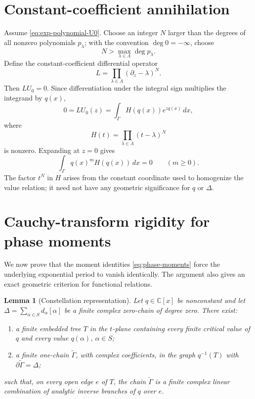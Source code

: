 \documentclass[11pt]{article}
\numberwithin{equation}{section}
\newtheorem{lemma}[lemma]{Lemma}
\theoremstyle{definition}
\theoremstyle{remark}
\newcommand{\C}{\mathbb C}
\begin{document}
\section{Constant-coefficient annihilation}\label{sec:annihilation}

Assume \eqref{eq:exp-polynomial-U0}.  Choose an integer $N$ larger than the
degrees of all nonzero polynomials $p_\lambda$; with the convention
$\deg0=-\infty$, choose
\[
  N>\max_{\lambda\in\Lambda}\deg p_\lambda.
\]
Define the constant-coefficient differential operator
\begin{equation}\label{eq:L-operator}
  L=\prod_{\lambda\in\Lambda}(\partial_z-\lambda)^N.
\end{equation}
Then $LU_0=0$.  Since differentiation under the integral sign multiplies the
integrand by $q(x)$,
\begin{equation}\label{eq:annihilated-integral}
  0=LU_0(z)
  =\int_\Gamma H(q(x))e^{zq(x)}\,dx,
\end{equation}
where
\begin{equation}\label{eq:H-def}
  H(t)=\prod_{\lambda\in\Lambda}(t-\lambda)^N
\end{equation}
is nonzero.  Expanding at $z=0$ gives
\begin{equation}\label{eq:phase-moments}
  \int_\Gamma q(x)^mH(q(x))\,dx=0
  \qquad(m\ge0).
\end{equation}
The factor $t^N$ in $H$ arises from the constant coordinate used to
homogenize the value relation; it need not have any geometric significance for
$q$ or $\Delta$.

\section{Cauchy-transform rigidity for phase moments}
\label{sec:phase-rigidity}

We now prove that the moment identities \eqref{eq:phase-moments} force the
underlying exponential period to vanish identically.  The argument also gives
an exact geometric criterion for functional relations.

\begin{lemma}[Constellation representation]\label{lem:constellation}
Let $q\in\C[x]$ be nonconstant and let
$\Delta=\sum_{\alpha\in S}d_\alpha[\alpha]$ be a finite complex zero-chain of
degree zero.  There exist:
\begin{enumerate}[label=\textup{(\roman*)},leftmargin=2.2em]
\item a finite embedded tree $T$ in the $t$-plane containing every finite
critical value of $q$ and every value $q(\alpha)$, $\alpha\in S$;
\item a finite one-chain $\widetilde\Gamma$, with complex coefficients, in the
graph $q^{-1}(T)$ with
$\partial\widetilde\Gamma=\Delta$;
\end{enumerate}
such that, on every open edge $e$ of $T$, the chain
$\widetilde\Gamma$ is a finite complex linear combination of analytic inverse
branches of $q$ over $e$.
\end{lemma}
\end{document}
